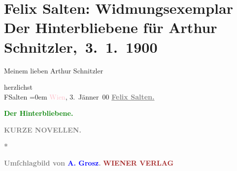 

\renewcommand{\erwaehntePersonen}{Personen: Adolf Grosz}
\renewcommand{\erwaehnteInstitutionen}{Institutionen: Buchhandlung L. Rosner, Wiener Verlag}
\renewcommand{\erwaehnteOrte}{Orte: Wien}
\renewcommand{\erwaehnteWerke}{Werke: Der Hinterbliebene. Kurze Novellen}
\section[ Felix Salten: Widmungsexemplar Der Hinterbliebene für Arthur Schnitzler, 3. 1. 1900]{Felix Salten: Widmungsexemplar Der Hinterbliebene für Arthur
               Schnitzler, 3. 1. 1900}
\nopagebreak{}
\rehead{ }\normalsize\beginnumbering{}
\toendnotes[C]{\smallbreak\pagebreak[2]}
\toendnotes[C]{\smallbreak}
\pstart
           \noindent{}{\pb}Meinem lieben Arthur Schnitzler\pend
           
\pstart
           herzlichst{\\[\baselineskip]}\spacefill\mbox{FSalten}\pend
           \leftskip=0em{}
\pstart
           \textcolor{pink}{Wien}{}\ledrightnote{\textcolor{pink}{Wien}}, 3. Jänner 00\pend
           {\bigskip}
\pstart
           \noindent{}\textcolor{gray}{\textbf{\textbf{\uline{Felix Salten.}}}}\pend
           
\pstart
           \centering{}\textcolor{gray}{\textbf{\textbf{\textcolor{green}{Der Hinterbliebene.}{}\ledrightnote{\textcolor{green}{Der Hinterbliebene. Kurze Novellen}}}}}\pend
           
\pstart
           \noindent{}\centering{}\textcolor{gray}{\textbf{KURZE NOVELLEN.}}\pend
           
\pstart
           \noindent{}\centering{}\textcolor{gray}{\textbf{*}}\pend
           
\pstart
           \noindent{}\centering{}\textcolor{gray}{\textbf{Umſchlagbild von \textcolor{blue}{A.
                     Grosz}{}\ledrightnote{\textcolor{blue}{Adolf Grosz}}.}}\pend
           {\bigskip}
\pstart
           \noindent{}\centering{}\textcolor{gray}{\textbf{\textcolor{brown}{WIENER VERLAG}{}\ledrightnote{\textcolor{brown}{Wiener Verlag}}}}\pend
           
